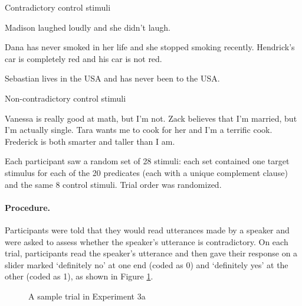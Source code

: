 \documentclass[11pt,fleqn]{article}
\newcommand{\6}{\mbox{$[\hspace*{-.6mm}[$}}
\newcommand{\9}{\mbox{$]\hspace*{-.6mm}]$}}
\begin{document}
{\begin{exe}

\ex\label{control-bad} Contradictory control stimuli
\begin{xlist}
\ex Madison laughed loudly and she didn't laugh.

\ex Dana has never smoked in her life and she stopped smoking recently.
\ex Hendrick's car is completely red and his car is not red.

\ex Sebastian lives in the USA and has never been to the USA.
\end{xlist}

\ex\label{control-good} Non-contradictory control stimuli
\begin{xlist}
\ex Vanessa is really good at math, but I'm not.
\ex Zack believes that I'm married, but I'm actually single.
\ex Tara wants me to cook for her and I'm a terrific cook.
\ex Frederick is both smarter and taller than I am.

\end{xlist}

\end{exe}

Each participant saw a random set of 28 stimuli: each set contained one target stimulus for each of the 20 predicates (each with a unique complement clause) and the same 8 control stimuli. Trial order was randomized.


\paragraph{Procedure.} Participants were told that they would read utterances made by a speaker and were asked to assess whether the speaker's utterance is contradictory. On each trial, participants read the speaker's utterance and then gave their response on a slider marked `definitely no' at one end (coded as 0) and `definitely yes' at the other (coded as 1), as shown in Figure \ref{f-trial-exp2}.

\begin{figure}[h!]
\begin{center}
\end{center}
\caption{A sample trial in Experiment 3a}\label{f-trial-exp2}
\end{figure}

}
\end{document}

